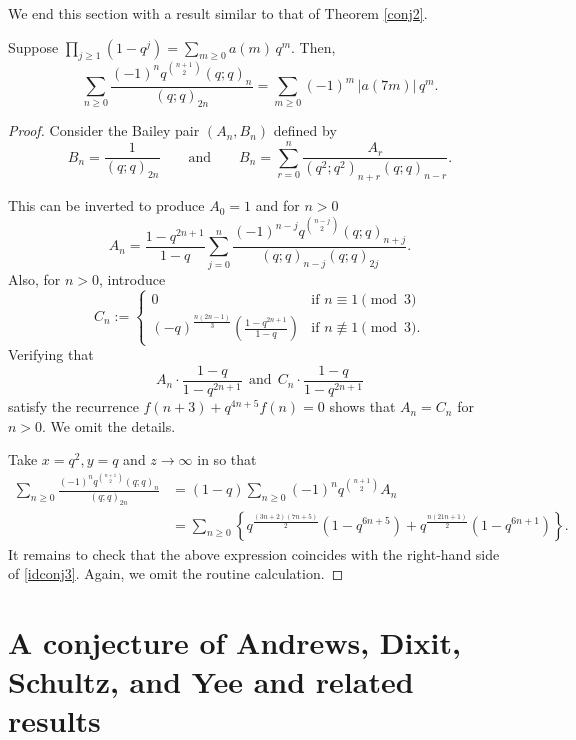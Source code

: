 \documentclass[a4paper,reqno,12pt]{amsart}
\begin{document}
We end this section with a result similar to that of Theorem \ref{conj2}.

\begin{theorem} \label{conj3} Suppose $\prod_{j\geq1} (1-q^j)=\sum_{m\geq0} a(m)\, q^m$. Then,
\begin{equation}\label{idconj3} \sum_{n\geq0} \frac{(-1)^n q^{\binom{n+1}2} (q;q)_n}{(q;q)_{2n}} = \sum_{m\geq0} (-1)^m\, \vert a(7m)\vert\, q^m.\end{equation}
\end{theorem}

\begin{proof} 
Consider the Bailey pair $(A_n,B_n)$ defined by
$$B_n=\frac1{(q;q)_{2n}} \qquad \text{and} \qquad B_n=\sum_{r=0}^n \frac{A_r}{(q^2;q^2)_{n+r}(q;q)_{n-r}}.$$


This can be inverted to produce $A_0=1$ and for $n>0$
$$A_n=\frac{1-q^{2n+1}}{1-q}  \sum_{j=0}^n \frac{(-1)^{n-j} q^{\binom{n-j}2} (q;q)_{n+j}}{(q;q)_{n-j}(q;q)_{2j}}.$$
Also, for $n>0$, introduce
$$C_n:= 
\begin{cases}    0  &\text{if $n\equiv1\pmod 3$} \\
(-q)^{\frac{n(2n-1)}3} \left( \frac{1-q^{2n+1}}{1-q}\right)  &\text{if $n\not\equiv 1 \pmod 3$}.
\end{cases}$$ Verifying that $$ A_n\cdot \frac{1-q}{1-q^{2n+1}} \ \ \text{and}\ \ C_n \cdot \frac{1-q}{1-q^{2n+1}}$$
 satisfy the recurrence 
$f(n+3)+q^{4n+5}f(n)=0$ shows that $A_n=C_n$ for $n>0$. We omit the details. 



\smallskip
\noindent
Take $x=q^2, y=q$ and $z\rightarrow\infty$ in \cite[eq'n (1.3)]{Slater} so that
\begin{align*}
\sum_{n\geq0} \frac{(-1)^n q^{\binom{n+1}2} (q;q)_n}{(q;q)_{2n}} 
&=(1-q)\sum_{n\geq0} (-1)^nq^{\binom{n+1}2} A_n  \\
&= \sum_{n\geq0}  \left\{ q^{\frac{(3n+2)(7n+5)}2}(1-q^{6n+5}) + q^{\frac{n(21n+1)}2}(1-q^{6n+1})\right\}.
\end{align*}
It remains to check that the above expression  coincides with the right-hand side of \eqref{idconj3}. Again, we omit the routine calculation. 
\end{proof}




\section{A conjecture of Andrews, Dixit, Schultz, and Yee and related results}
\end{document}
